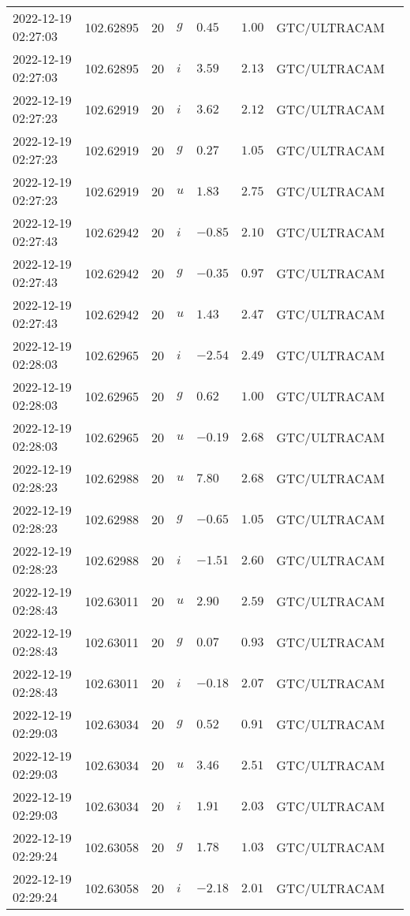 \documentclass{nature_plusfigure}
\begin{document}
\begin{supplement}
\begin{center}
\begin{longtable}{llllllll}
2022-12-19 02:27:03 & 102.62895 & 20 & $g$ & $0.45$ & $1.00$ & GTC/ULTRACAM &  \\ 
2022-12-19 02:27:03 & 102.62895 & 20 & $i$ & $3.59$ & $2.13$ & GTC/ULTRACAM &  \\ 
2022-12-19 02:27:23 & 102.62919 & 20 & $i$ & $3.62$ & $2.12$ & GTC/ULTRACAM &  \\ 
2022-12-19 02:27:23 & 102.62919 & 20 & $g$ & $0.27$ & $1.05$ & GTC/ULTRACAM &  \\ 
2022-12-19 02:27:23 & 102.62919 & 20 & $u$ & $1.83$ & $2.75$ & GTC/ULTRACAM &  \\ 
2022-12-19 02:27:43 & 102.62942 & 20 & $i$ & $-0.85$ & $2.10$ & GTC/ULTRACAM &  \\ 
2022-12-19 02:27:43 & 102.62942 & 20 & $g$ & $-0.35$ & $0.97$ & GTC/ULTRACAM &  \\ 
2022-12-19 02:27:43 & 102.62942 & 20 & $u$ & $1.43$ & $2.47$ & GTC/ULTRACAM &  \\ 
2022-12-19 02:28:03 & 102.62965 & 20 & $i$ & $-2.54$ & $2.49$ & GTC/ULTRACAM &  \\ 
2022-12-19 02:28:03 & 102.62965 & 20 & $g$ & $0.62$ & $1.00$ & GTC/ULTRACAM &  \\ 
2022-12-19 02:28:03 & 102.62965 & 20 & $u$ & $-0.19$ & $2.68$ & GTC/ULTRACAM &  \\ 
2022-12-19 02:28:23 & 102.62988 & 20 & $u$ & $7.80$ & $2.68$ & GTC/ULTRACAM &  \\ 
2022-12-19 02:28:23 & 102.62988 & 20 & $g$ & $-0.65$ & $1.05$ & GTC/ULTRACAM &  \\ 
2022-12-19 02:28:23 & 102.62988 & 20 & $i$ & $-1.51$ & $2.60$ & GTC/ULTRACAM &  \\ 
2022-12-19 02:28:43 & 102.63011 & 20 & $u$ & $2.90$ & $2.59$ & GTC/ULTRACAM &  \\ 
2022-12-19 02:28:43 & 102.63011 & 20 & $g$ & $0.07$ & $0.93$ & GTC/ULTRACAM &  \\ 
2022-12-19 02:28:43 & 102.63011 & 20 & $i$ & $-0.18$ & $2.07$ & GTC/ULTRACAM &  \\ 
2022-12-19 02:29:03 & 102.63034 & 20 & $g$ & $0.52$ & $0.91$ & GTC/ULTRACAM &  \\ 
2022-12-19 02:29:03 & 102.63034 & 20 & $u$ & $3.46$ & $2.51$ & GTC/ULTRACAM &  \\ 
2022-12-19 02:29:03 & 102.63034 & 20 & $i$ & $1.91$ & $2.03$ & GTC/ULTRACAM &  \\ 
2022-12-19 02:29:24 & 102.63058 & 20 & $g$ & $1.78$ & $1.03$ & GTC/ULTRACAM &  \\ 
2022-12-19 02:29:24 & 102.63058 & 20 & $i$ & $-2.18$ & $2.01$ & GTC/ULTRACAM &  \\ 

\end{longtable}
\end{center}
\end{supplement}
\end{document}
